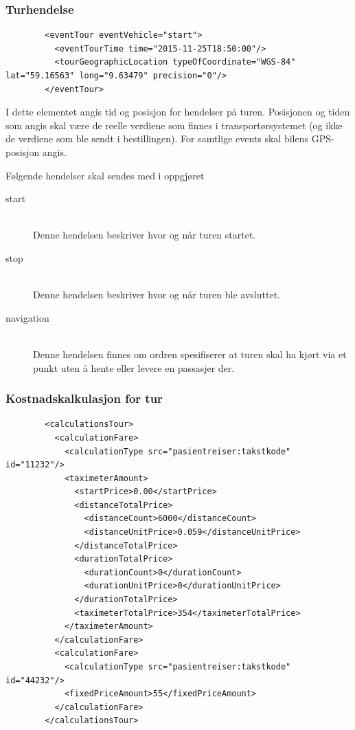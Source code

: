 \documentclass[a4paper,titlepage,norsk,11pt]{article}
\begin{document}
\subsubsection{Turhendelse}

\begin{lstlisting}
        <eventTour eventVehicle="start">
          <eventTourTime time="2015-11-25T18:50:00"/>
          <tourGeographicLocation typeOfCoordinate="WGS-84" lat="59.16563" long="9.63479" precision="0"/>
        </eventTour>
\end{lstlisting}

I dette elementet angis tid og posisjon for hendelser på turen. Posisjonen og tiden som angis skal være de reelle verdiene som finnes i transportørsystemet (og ikke de verdiene som ble sendt i bestillingen). For samtlige events skal bilens GPS-posisjon angis.

Følgende hendelser skal sendes med i oppgjøret

\begin{description}

  \item[start] \hfill \\
  Denne hendelsen beskriver hvor og når turen startet.

  \item[stop] \hfill \\
  Denne hendelsen beskriver hvor og når turen ble avsluttet.

	\item[navigation] \hfill \\
	Denne hendelsen finnes om ordren spesifiserer at turen skal ha kjørt via et punkt uten å hente eller levere en passasjer der.

\end{description}

\subsubsection{Kostnadskalkulasjon for tur}

\begin{lstlisting}
        <calculationsTour>
          <calculationFare>
            <calculationType src="pasientreiser:takstkode" id="11232"/>
            <taximeterAmount>
              <startPrice>0.00</startPrice>
              <distanceTotalPrice>
                <distanceCount>6000</distanceCount>
                <distanceUnitPrice>0.059</distanceUnitPrice>
              </distanceTotalPrice>
              <durationTotalPrice>
                <durationCount>0</durationCount>
                <durationUnitPrice>0</durationUnitPrice>
              </durationTotalPrice>
              <taximeterTotalPrice>354</taximeterTotalPrice>
            </taximeterAmount>
          </calculationFare>
          <calculationFare>
            <calculationType src="pasientreiser:takstkode" id="44232"/>
            <fixedPriceAmount>55</fixedPriceAmount>
          </calculationFare>
        </calculationsTour>
\end{lstlisting}
\end{document}
